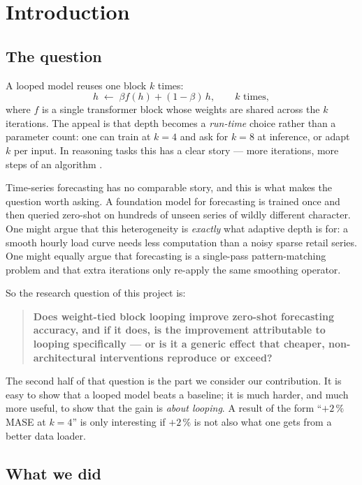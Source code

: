 \section{Introduction}
\label{sec:intro}

\subsection{The question}

A looped model reuses one block $k$ times:
\[
  h \;\leftarrow\; \beta f(h) + (1-\beta)\,h,
  \qquad k \text{ times},
\]
where $f$ is a single transformer block whose weights are shared across the $k$
iterations. The appeal is that depth becomes a \emph{run-time} choice rather
than a parameter count: one can train at $k=4$ and ask for $k=8$ at inference,
or adapt $k$ per input. In reasoning tasks this has a clear story --- more
iterations, more steps of an algorithm \citep{dehghani2019universal,
giannou2023looped, zhu2026ouro}.

Time-series forecasting has no comparable story, and this is what makes the
question worth asking. A foundation model for forecasting is trained once and
then queried zero-shot on hundreds of unseen series of wildly different
character. One might argue that this heterogeneity is \emph{exactly} what
adaptive depth is for: a smooth hourly load curve needs less computation than a
noisy sparse retail series. One might equally argue that forecasting is a
single-pass pattern-matching problem and that extra iterations only re-apply
the same smoothing operator.

So the research question of this project is:

\begin{quote}
\textbf{Does weight-tied block looping improve zero-shot forecasting accuracy,
and if it does, is the improvement attributable to looping specifically --- or
is it a generic effect that cheaper, non-architectural interventions reproduce
or exceed?}
\end{quote}

The second half of that question is the part we consider our contribution. It
is easy to show that a looped model beats a baseline; it is much harder, and
much more useful, to show that the gain is \emph{about looping}. A result of
the form ``$+2\,\%$ MASE at $k=4$'' is only interesting if $+2\,\%$ is not also
what one gets from a better data loader.

\subsection{What we did}

